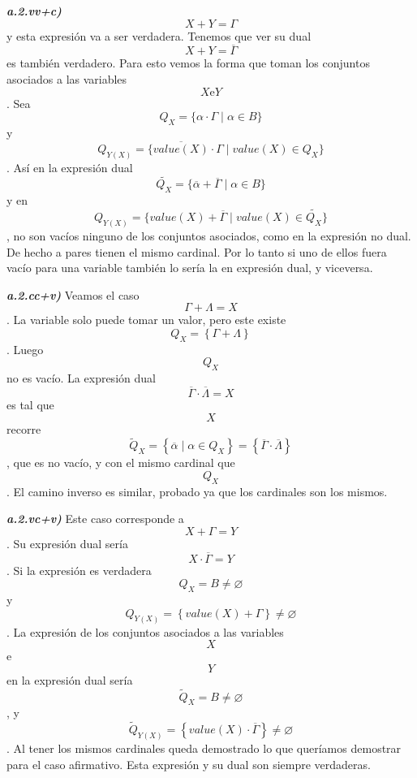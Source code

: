 \documentclass[
]{article}
\begin{document}
\begin{enumerate}
\begin{enumerate}
\begin{enumerate}
\begin{enumerate}
\begin{enumerate}
          \emph{\textbf{a.2.vv+c)}} \[{X + Y} = \Gamma\]y esta expresión
          va a ser verdadera. Tenemos que ver su dual
          \[{X + Y} = \overline{\Gamma}\]es también verdadero. Para esto
          vemos la forma que to\-man los conjuntos asociados a las
          variables \[X\text{e}Y\]. Sea
          \[Q_{X} = {\{{{\alpha \cdot \Gamma} \mid {\alpha \in B}}\}}\]
          y
          \[Q_{Y{(X)}} = {\{{{\overline{\mathit{value}{(X)}} \cdot \Gamma} \mid \mathit{value}{{(X)} \in Q_{X}}}\}}\].
          Así en la expresión dual
          \[\widetilde{Q_{X}} = {\{{{\overline{\alpha} + \overline{\Gamma}} \mid {\alpha \in B}}\}}\]
          y en
          \[Q_{Y{(X)}} = {\{{{{\mathit{value}{(X)}} + \overline{\Gamma}} \mid \mathit{value}{{(X)} \in \widetilde{Q_{X}}}}\}}\],
          no son vacíos ninguno de los con\-juntos asociados, como en la
          expresión no dual. De hecho a pares tienen el mismo cardinal.
          Por lo tanto si uno de ellos fuera vacío para una variable
          también lo sería la en expresión dual, y viceversa.

          \emph{\textbf{a.2.cc+v)}} Veamos el caso
          \[{\Gamma + \Lambda} = X\]. La variable solo puede tomar un
          va\-lor, pero este existe
          \[Q_{X} = \left\{ {\Gamma + \Lambda} \right\}\]. Luego
          \[Q_{X}\]no es vacío. La expresión dual
          \[{\overline{\Gamma} \cdot \overline{\Lambda}} = X\]es tal que
          \[X\]recorre
          \[{{\widetilde{Q}}_{X} = \left\{ {\overline{\alpha} \mid {\alpha \in Q_{X}}} \right\}} = \left\{ {\overline{\Gamma} \cdot \overline{\Lambda}} \right\}\],
          que es no vacío, y con el mismo cardinal que \[Q_{X}\]. El
          camino inverso es similar, probado ya que los cardinales son
          los mismos.

          \emph{\textbf{a.2.vc+v)}} Este caso corresponde a
          \[{X + \Gamma} = Y\]. Su expresión dual sería
          \[{X \cdot \overline{\Gamma}} = Y\]. Si la expresión es
          verdadera \[{Q_{X} = B} \neq \varnothing\]y
          \[{Q_{Y{(X)}} = \left\{ {\mathit{value}{{(X)} + \Gamma}} \right\}} \neq \varnothing\].
          La expresión de los conjuntos asociados a las variables \[X\]
          e \[Y\] en la expresión dual sería
          \[{{\widetilde{Q}}_{X} = B} \neq \varnothing\], y
          \[{{\widetilde{Q}}_{Y{(X)}} = \left\{ {{\mathit{value}{(X)}} \cdot \overline{\Gamma}} \right\}} \neq \varnothing\].
          Al tener los mismos cardinales queda demos\-trado lo que
          queríamos demostrar para el caso afirmativo. Esta expresión y
          su dual son siempre verdaderas.


\end{enumerate}
\end{enumerate}
\end{enumerate}
\end{enumerate}
\end{enumerate}
\end{document}
